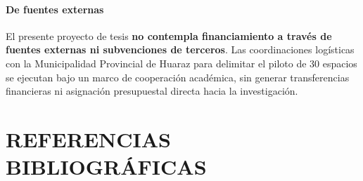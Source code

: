 \documentclass[12pt,a4paper]{article}
\begin{document}
\paragraph{De fuentes externas}
El presente proyecto de tesis \textbf{no contempla financiamiento a través de fuentes externas ni subvenciones de terceros}. Las coordinaciones logísticas con la Municipalidad Provincial de Huaraz para delimitar el piloto de 30 espacios se ejecutan bajo un marco de cooperación académica, sin generar transferencias financieras ni asignación presupuestal directa hacia la investigación.

\clearpage
\section{REFERENCIAS BIBLIOGRÁFICAS}
\end{document}
